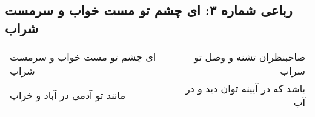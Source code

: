 \begin{center}
\section*{رباعی شماره ۳: ای چشم تو مست خواب و سرمست شراب}
\label{sec:003}
\begin{longtable}{l p{0.5cm} r}
ای چشم تو مست خواب و سرمست شراب
&&
صاحبنظران تشنه و وصل تو سراب
\\
مانند تو آدمی در آباد و خراب
&&
باشد که در آیینه توان دید و در آب
\\
\end{longtable}
\end{center}

